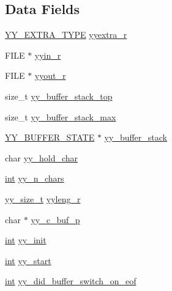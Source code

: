 \subsection*{Data Fields}
\begin{DoxyCompactItemize}
\item 
\hyperlink{util__expr__scan_8c_a26938d921de835f6183c02e54cf08828}{Y\+Y\+\_\+\+E\+X\+T\+R\+A\+\_\+\+T\+Y\+PE} \hyperlink{structyyguts__t_aef05c0d6725a5214f6b30466f0b01c47}{yyextra\+\_\+r}
\item 
F\+I\+LE $\ast$ \hyperlink{structyyguts__t_a21f81ca100b12364a5095a37d1c6f650}{yyin\+\_\+r}
\item 
F\+I\+LE $\ast$ \hyperlink{structyyguts__t_a436368a905aaf12e809e265749c74031}{yyout\+\_\+r}
\item 
size\+\_\+t \hyperlink{structyyguts__t_af92507d904af2fcd4509acde654a9850}{yy\+\_\+buffer\+\_\+stack\+\_\+top}
\item 
size\+\_\+t \hyperlink{structyyguts__t_a4435bb91e87f9988b096afc21386289a}{yy\+\_\+buffer\+\_\+stack\+\_\+max}
\item 
\hyperlink{util__expr__scan_8c_a4e5bd2d129903df83f3d13effaf8f3e4}{Y\+Y\+\_\+\+B\+U\+F\+F\+E\+R\+\_\+\+S\+T\+A\+TE} $\ast$ \hyperlink{structyyguts__t_ad0b9d576189d518a4482f20ed9b2a416}{yy\+\_\+buffer\+\_\+stack}
\item 
char \hyperlink{structyyguts__t_adde3f71374c223bbac47284824996e86}{yy\+\_\+hold\+\_\+char}
\item 
\hyperlink{pcre_8txt_a42dfa4ff673c82d8efe7144098fbc198}{int} \hyperlink{structyyguts__t_a99c9218941829a6662d358422fd4184a}{yy\+\_\+n\+\_\+chars}
\item 
\hyperlink{util__expr__scan_8c_ad557845057f187eec4be07e2717d2afa}{yy\+\_\+size\+\_\+t} \hyperlink{structyyguts__t_ab55d594683be54bcd45a64c4bf26427e}{yyleng\+\_\+r}
\item 
char $\ast$ \hyperlink{structyyguts__t_ab1b9bcacb33aab1e02b625512bc0e221}{yy\+\_\+c\+\_\+buf\+\_\+p}
\item 
\hyperlink{pcre_8txt_a42dfa4ff673c82d8efe7144098fbc198}{int} \hyperlink{structyyguts__t_abbef56b2d8359f6a15629c104f5dd030}{yy\+\_\+init}
\item 
\hyperlink{pcre_8txt_a42dfa4ff673c82d8efe7144098fbc198}{int} \hyperlink{structyyguts__t_a8baf7d47fe53035d9bc2a9670795ff01}{yy\+\_\+start}
\item 
\hyperlink{pcre_8txt_a42dfa4ff673c82d8efe7144098fbc198}{int} \hyperlink{structyyguts__t_a2daec411627700709ef2fd927e69627d}{yy\+\_\+did\+\_\+buffer\+\_\+switch\+\_\+on\+\_\+eof}

\end{DoxyCompactItemize}
